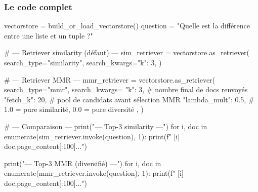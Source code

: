 \documentclass[11pt,a4paper]{article}
\begin{document}
\begin{center}
\end{center}

\subsubsection{Le code complet}

\begin{pythoncode}
vectorstore = build_or_load_vectorstore()
question = "Quelle est la différence entre une liste et un tuple ?"

# --- Retriever similarity (défaut) ---
sim_retriever = vectorstore.as_retriever(
    search_type="similarity",
    search_kwargs={"k": 3},
)

# --- Retriever MMR ---
mmr_retriever = vectorstore.as_retriever(
    search_type="mmr",
    search_kwargs={
        "k": 3,                    # nombre final de docs renvoyés
        "fetch_k": 20,             # pool de candidats avant sélection MMR
        "lambda_mult": 0.5,        # 1.0 = pure similarité, 0.0 = pure diversité
    },
)

# --- Comparaison ---
print("--- Top-3 similarity ---")
for i, doc in enumerate(sim_retriever.invoke(question), 1):
    print(f"  [{i}] {doc.page_content[:100]}...")

print("\n--- Top-3 MMR (diversifié) ---")
for i, doc in enumerate(mmr_retriever.invoke(question), 1):
    print(f"  [{i}] {doc.page_content[:100]}...")
\end{pythoncode}
\end{document}
